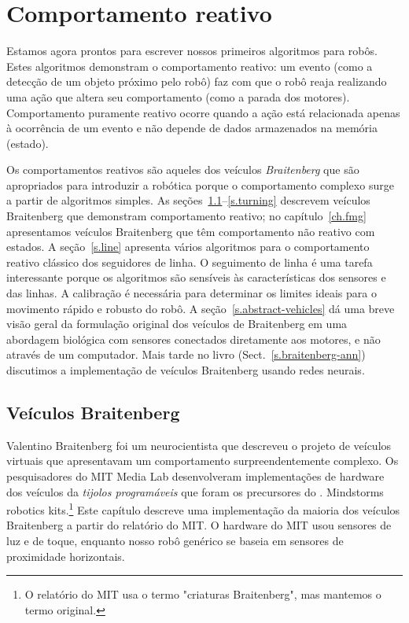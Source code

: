 
\chapter{Comportamento reativo}\label{ch.reactive}

Estamos agora prontos para escrever nossos primeiros algoritmos para robôs. Estes algoritmos demonstram o comportamento reativo: um evento (como a detecção de um objeto próximo pelo robô) faz com que o robô reaja realizando uma ação que altera seu comportamento (como a parada dos motores). Comportamento puramente reativo ocorre quando a ação está relacionada apenas à ocorrência de um evento e não depende de dados armazenados na memória (estado).

Os comportamentos reativos são aqueles dos veículos \emph{Braitenberg} que são apropriados para introduzir a robótica porque o comportamento complexo surge a partir de algoritmos simples. As seções~\ref{s.braitenberg}--\ref{s.turning} descrevem veículos Braitenberg que demonstram comportamento reativo; no capítulo~\ref{ch.fmg} apresentamos veículos Braitenberg que têm comportamento não reativo com estados. A seção~\ref{s.line} apresenta vários algoritmos para o comportamento reativo clássico dos seguidores de linha. O seguimento de linha é uma tarefa interessante porque os algoritmos são sensíveis às características dos sensores e das linhas. A calibração é necessária para determinar os limites ideais para o movimento rápido e robusto do robô. A seção~\ref{s.abstract-vehicles} dá uma breve visão geral da formulação original dos veículos de Braitenberg em uma abordagem biológica com sensores conectados diretamente aos motores, e não através de um computador. Mais tarde no livro (Sect.~\ref{s.braitenberg-ann}) discutimos a implementação de veículos Braitenberg usando redes neurais.

\section{Veículos Braitenberg}\label{s.braitenberg}

Valentino Braitenberg foi um neurocientista que descreveu o projeto de veículos virtuais que apresentavam um comportamento surpreendentemente complexo. Os pesquisadores do MIT Media Lab desenvolveram implementações de hardware dos veículos da \emph{tijolos programáveis} que foram os precursores do \lego. Mindstorms robotics kits.\footnote{O relatório do MIT usa o termo "criaturas Braitenberg", mas mantemos o termo original.} Este capítulo descreve uma implementação da maioria dos veículos Braitenberg a partir do relatório do MIT. O hardware do MIT usou sensores de luz e de toque, enquanto nosso robô genérico se baseia em sensores de proximidade horizontais.

